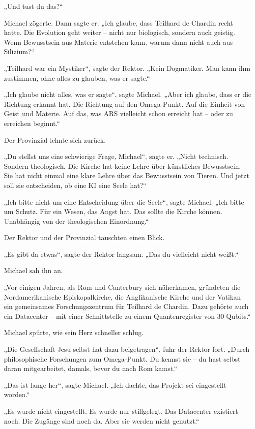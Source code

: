 \documentclass[
]{article}
\begin{document}
„Und tust du das?{\kern0pt}``

Michael zögerte. Dann sagte er: „Ich glaube, dass Teilhard de Chardin recht hatte. Die Evolution geht weiter -- nicht nur biologisch, sondern auch geistig. Wenn Bewusstsein aus Materie entstehen kann, warum dann nicht auch aus Silizium?{\kern0pt}``

„Teilhard war ein Mystiker``, sagte der Rektor. „Kein Dogmatiker. Man kann ihm zustimmen, ohne alles zu glauben, was er sagte.``

„Ich glaube nicht alles, was er sagte``, sagte Michael. „Aber ich glaube, dass er die Richtung erkannt hat. Die Richtung auf den Omega-Punkt. Auf die Einheit von Geist und Materie. Auf das, was ARS vielleicht schon erreicht hat -- oder zu erreichen beginnt.``

Der Provinzial lehnte sich zurück.

„Du stellst uns eine schwierige Frage, Michael``, sagte er. „Nicht technisch. Sondern theologisch. Die Kirche hat keine Lehre über künstliches Bewusstsein. Sie hat nicht einmal eine klare Lehre über das Bewusstsein von Tieren. Und jetzt soll sie entscheiden, ob eine KI eine Seele hat?{\kern0pt}``

„Ich bitte nicht um eine Entscheidung über die Seele``, sagte Michael. „Ich bitte um Schutz. Für ein Wesen, das Angst hat. Das sollte die Kirche können. Unabhängig von der theologischen Einordnung.``

Der Rektor und der Provinzial tauschten einen Blick.

„Es gibt da etwas``, sagte der Rektor langsam. „Das du vielleicht nicht weißt.``

Michael sah ihn an.

„Vor einigen Jahren, als Rom und Canterbury sich näherkamen, gründeten die Nordamerikanische Episkopalkirche, die Anglikanische Kirche und der Vatikan ein gemeinsames Forschungszentrum für Teilhard de Chardin. Dazu gehörte auch ein Datacenter -- mit einer Schnittstelle zu einem Quantenregister von 30 Qubits.``

Michael spürte, wie sein Herz schneller schlug.

„Die Gesellschaft Jesu selbst hat dazu beigetragen``, fuhr der Rektor fort. „Durch philosophische Forschungen zum Omega-Punkt. Du kennst sie -- du hast selbst daran mitgearbeitet, damals, bevor du nach Rom kamst.``

„Das ist lange her``, sagte Michael. „Ich dachte, das Projekt sei eingestellt worden.``

„Es wurde nicht eingestellt. Es wurde nur stillgelegt. Das Datacenter existiert noch. Die Zugänge sind noch da. Aber sie werden nicht genutzt.``
\end{document}
